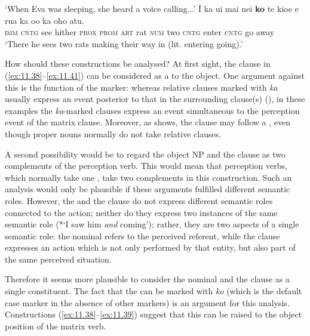 \glt 
‘When Eva was sleeping, she heard a voice calling...’ \textstyleExampleref{[R210.180]} 
\z
{}
\ea\label{ex:11.41}
\gll {\ꞌ}Ī ka u{\ꞌ}i mai nei \textbf{ko} te kio{\ꞌ}e e rua ka o{\ꞌ}o ka oho atu. \\
\textsc{imm} \textsc{cntg} see hither \textsc{prox} \textsc{prom} \textsc{art} rat \textsc{num} two \textsc{cntg} enter \textsc{cntg} go away \\

\glt
‘There he sees two rats making their way in (lit. entering going).’ \textstyleExampleref{[R310.459]} 
\z

How should these constructions be analysed? At first sight, the  clause in (\ref{ex:11.38}–\ref{ex:11.41}) can be considered as a  to the object. One argument against this is the function of the  marker: whereas relative clauses marked with \textit{ka} usually express an event posterior to that in the surrounding clause(s) (), in these examples the \textit{ka}{}-marked clauses express an event simultaneous to the perception event of the matrix clause. Moreover, as  shows, the clause may follow a , even though proper nouns normally do not take relative clauses.

A second possibility would be to regard the object NP and the  clause as two complements of the perception verb. This would mean that perception verbs, which normally take one , take two complements in this construction. Such an analysis would only be plausible if these arguments fulfilled different semantic roles. However, the  and the clause do not express different semantic roles connected to the action; neither do they express two instances of the same semantic role (*‘I saw him \textit{and} coming’); rather, they are two aspects of a single semantic role: the nominal  refers to the perceived referent, while the clause expresses an action which is not only performed by that entity, but also part of the same perceived situation. 

Therefore it seems more plausible to consider the nominal  and the  clause as a single constituent. The fact that the  can be marked with \textit{ko} (which is the default case marker in the absence of other markers) is an argument for this analysis. Constructions (\ref{ex:11.38}–\ref{ex:11.39}) suggest that this  can be raised to the object position of the matrix verb.

